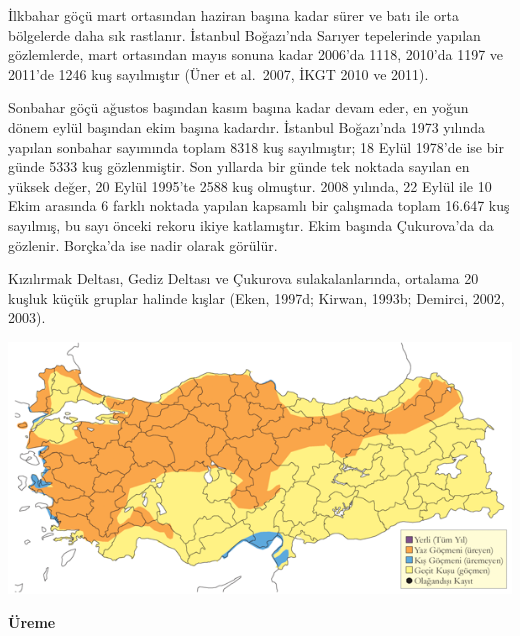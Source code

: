 \documentclass[
  a4paper,
  DIV=11,
  numbers=noendperiod]{scrreprt}
\begin{document}
İlkbahar göçü mart ortasından haziran başına kadar sürer ve batı ile
orta bölgelerde daha sık rastlanır. İstanbul Boğazı'nda Sarıyer
tepelerinde yapılan gözlemlerde, mart ortasından mayıs sonuna kadar
2006'da 1118, 2010'da 1197 ve 2011'de 1246 kuş sayılmıştır (Üner et
al.~2007, İKGT 2010 ve 2011).

Sonbahar göçü ağustos başından kasım başına kadar devam eder, en yoğun
dönem eylül başından ekim başına kadardır. İstanbul Boğazı'nda 1973
yılında yapılan sonbahar sayımında toplam 8318 kuş sayılmıştır; 18 Eylül
1978'de ise bir günde 5333 kuş gözlenmiştir. Son yıllarda bir günde tek
noktada sayılan en yüksek değer, 20 Eylül 1995'te 2588 kuş olmuştur.
2008 yılında, 22 Eylül ile 10 Ekim arasında 6 farklı noktada yapılan
kapsamlı bir çalışmada toplam 16.647 kuş sayılmış, bu sayı önceki rekoru
ikiye katlamıştır. Ekim başında Çukurova'da da gözlenir. Borçka'da ise
nadir olarak görülür.

Kızılırmak Deltası, Gediz Deltası ve Çukurova sulakalanlarında, ortalama
20 kuşluk küçük gruplar halinde kışlar (Eken, 1997d; Kirwan, 1993b;
Demirci, 2002, 2003).

\includegraphics{images/harita_Page_059.png}

\textbf{Üreme}
\end{document}
